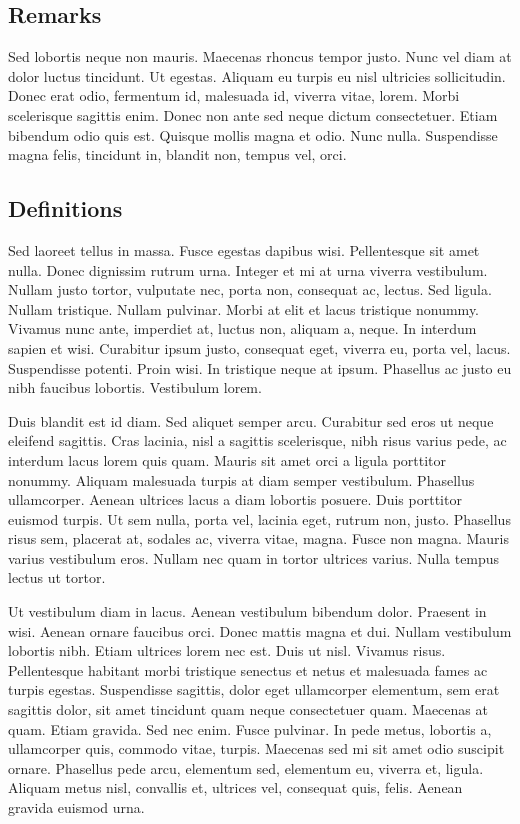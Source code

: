 \documentclass[a4paper,11pt]{kth-mag}
\begin{document}
\subsection{Remarks}

Sed lobortis neque non mauris. Maecenas rhoncus tempor justo. Nunc vel
diam at dolor luctus tincidunt. Ut egestas. Aliquam eu turpis eu nisl
ultricies sollicitudin. Donec erat odio, fermentum id, malesuada id,
viverra vitae, lorem. Morbi scelerisque sagittis enim. Donec non ante
sed neque dictum consectetuer. Etiam bibendum odio quis est. Quisque
mollis magna et odio. Nunc nulla. Suspendisse magna felis, tincidunt
in, blandit non, tempus vel, orci.

\subsection{Definitions}

Sed laoreet tellus in massa. Fusce egestas dapibus wisi. Pellentesque
sit amet nulla. Donec dignissim rutrum urna. Integer et mi at urna
viverra vestibulum. Nullam justo tortor, vulputate nec, porta non,
consequat ac, lectus. Sed ligula. Nullam tristique. Nullam pulvinar.
Morbi at elit et lacus tristique nonummy. Vivamus nunc ante, imperdiet
at, luctus non, aliquam a, neque. In interdum sapien et wisi.
Curabitur ipsum justo, consequat eget, viverra eu, porta vel, lacus.
Suspendisse potenti. Proin wisi. In tristique neque at ipsum.
Phasellus ac justo eu nibh faucibus lobortis. Vestibulum lorem.

Duis blandit est id diam. Sed aliquet semper arcu. Curabitur sed eros
ut neque eleifend sagittis. Cras lacinia, nisl a sagittis scelerisque,
nibh risus varius pede, ac interdum lacus lorem quis quam. Mauris sit
amet orci a ligula porttitor nonummy. Aliquam malesuada turpis at diam
semper vestibulum. Phasellus ullamcorper. Aenean ultrices lacus a diam
lobortis posuere. Duis porttitor euismod turpis. Ut sem nulla, porta
vel, lacinia eget, rutrum non, justo. Phasellus risus sem, placerat
at, sodales ac, viverra vitae, magna. Fusce non magna. Mauris varius
vestibulum eros. Nullam nec quam in tortor ultrices varius. Nulla
tempus lectus ut tortor.

Ut vestibulum diam in lacus. Aenean vestibulum bibendum dolor.
Praesent in wisi. Aenean ornare faucibus orci. Donec mattis magna et
dui. Nullam vestibulum lobortis nibh. Etiam ultrices lorem nec est.
Duis ut nisl. Vivamus risus. Pellentesque habitant morbi tristique
senectus et netus et malesuada fames ac turpis egestas. Suspendisse
sagittis, dolor eget ullamcorper elementum, sem erat sagittis dolor,
sit amet tincidunt quam neque consectetuer quam. Maecenas at quam.
Etiam gravida. Sed nec enim. Fusce pulvinar. In pede metus, lobortis
a, ullamcorper quis, commodo vitae, turpis. Maecenas sed mi sit amet
odio suscipit ornare. Phasellus pede arcu, elementum sed, elementum
eu, viverra et, ligula. Aliquam metus nisl, convallis et, ultrices
vel, consequat quis, felis. Aenean gravida euismod urna.
\end{document}
